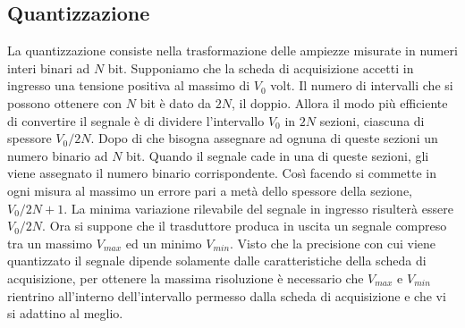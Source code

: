 \documentclass[a4paper]{report} %
\begin{document}
\subsection{Quantizzazione}
La quantizzazione consiste nella trasformazione delle ampiezze misurate in numeri interi binari ad $N$ bit. Supponiamo che la scheda di acquisizione accetti in ingresso una tensione positiva al massimo di $ V_{0} $ volt. Il numero di intervalli che si possono ottenere con $N$ bit è dato da $2N$, il doppio. Allora il modo più efficiente di convertire il segnale è di dividere l'intervallo $ V_{0} $ in $2N$ sezioni, ciascuna di spessore $ V_{0}/2N $. Dopo di che bisogna assegnare ad ognuna di queste sezioni un numero binario ad $N$ bit. Quando il segnale cade in una di queste sezioni, gli viene assegnato il numero binario corrispondente. Così facendo si commette in ogni misura al massimo un errore pari a metà dello spessore della sezione, $ V_{0}/2N+1 $. La minima variazione rilevabile del segnale in ingresso risulterà essere $ V_{0}/2N $. Ora si suppone che il trasduttore produca in uscita un segnale compreso tra un massimo $ V_{max} $ ed un minimo $ V_{min} $. Visto che la precisione con cui viene quantizzato il segnale dipende solamente dalle caratteristiche della scheda di acquisizione, per ottenere la massima risoluzione è necessario che $V_{max}$ e $V_{min}$ rientrino all'interno dell'intervallo permesso dalla scheda di acquisizione e che vi si adattino al meglio. 
\end{document}
